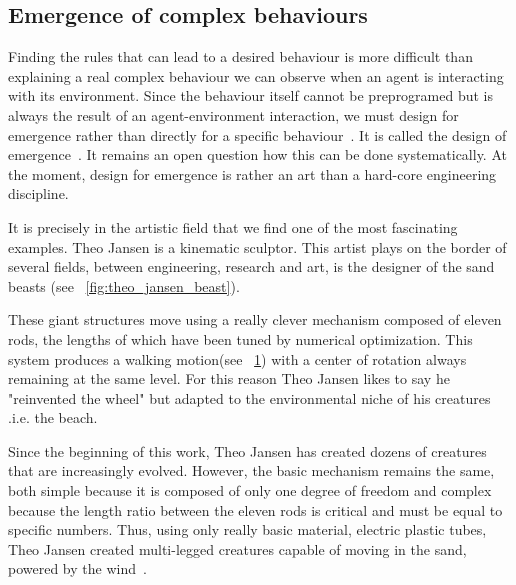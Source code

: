 \subsection{Emergence of complex behaviours} %

Finding the rules that can lead to a desired behaviour is more difficult than explaining a real complex behaviour we can observe when an agent is interacting with its environment. Since the behaviour itself cannot be preprogramed but is always the result of an agent-environment interaction, we must design for emergence rather than directly for a specific behaviour~\cite{Pfeifer06}. It is called the design of emergence~\cite{Steels1991emergence}. It remains an open question how this can be done systematically. At the moment, design for emergence is rather an art than a hard-core engineering discipline.

It is precisely in the artistic field that we find one of the most fascinating examples. Theo Jansen is a kinematic sculptor. This artist plays on the border of several fields, between engineering, research and art, is the designer of the sand beasts (see \figurename~\ref{fig:theo_jansen_beast}).

\begin{figure}[tb]
\centering
    \newline
    \hfil
    \hfil
    \caption{}
    \label{fig:beast_mechanism}
\end{figure}


These giant structures move using a really clever mechanism composed of eleven rods, the lengths of which have been tuned by numerical optimization. This system produces a walking motion(see \figurename~\ref{fig:beast_mechanism}) with a center of rotation always remaining at the same level. For this reason Theo Jansen likes to say he "reinvented the wheel" but adapted to the environmental niche of his creatures .i.e. the beach.

Since the beginning of this work, Theo Jansen has created dozens of creatures that are increasingly evolved. However, the basic mechanism remains the same, both simple because it is composed of only one degree of freedom and complex because the length ratio between the eleven rods is critical and must be equal to specific numbers. Thus, using only really basic material, electric plastic tubes, Theo Jansen created multi-legged creatures capable of moving in the sand, powered by the wind~\cite{jansen2007theo}.




